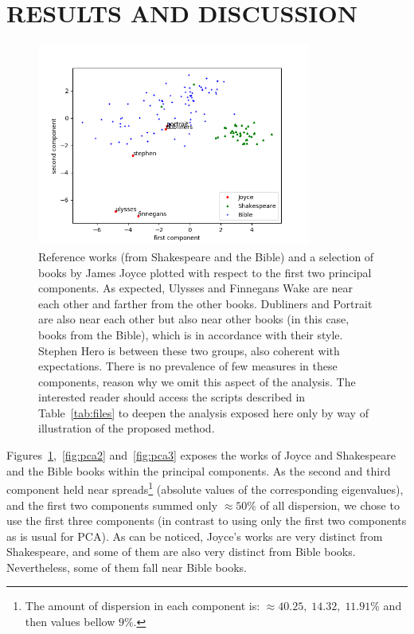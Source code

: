 \documentclass[12pt,fleqn]{article}
\begin{document}
\section{RESULTS AND DISCUSSION}\label{sec:res}

\begin{figure}[!htbp] %
\vspace{-2pt}
\begin{center}
\includegraphics[height=6.7cm,width=9cm]{figs/pca}%
    \caption{Reference works (from Shakespeare and the Bible) and a selection of books by James Joyce plotted with respect to the first two principal components.
    As expected, Ulysses and Finnegans Wake are near each other and farther from the other books. Dubliners and Portrait are also near each other but also near other books (in this case, books from the Bible), which is in accordance with their style.
    Stephen Hero is between these two groups, also coherent with expectations.
    There is no prevalence of few measures in these components, reason why we omit this aspect of the analysis.
    The interested reader should access the scripts described in Table~\ref{tab:files} to deepen the analysis exposed here only by way of illustration of the proposed method.}
\label{fig:pca1}%
\end{center}
\end{figure}

Figures~\ref{fig:pca1},~\ref{fig:pca2} and~\ref{fig:pca3} exposes the works of Joyce and
Shakespeare and the Bible books within the principal components.
As the second and third component held near spreads\footnote{The
amount of dispersion in each component is:
$\approx 40.25,\; 14.32,\; 11.91\%$ and then values bellow $9\%$.} (absolute values of the corresponding eigenvalues),
and the first two components summed only $\approx 50\%$ of all dispersion,
we chose to use the first three components (in contrast to using only the first two components as is usual for PCA).
As can be noticed, Joyce's works are very distinct from Shakespeare,
and some of them are also very distinct from Bible books.
Nevertheless, some of them fall near Bible books.
\end{document}
